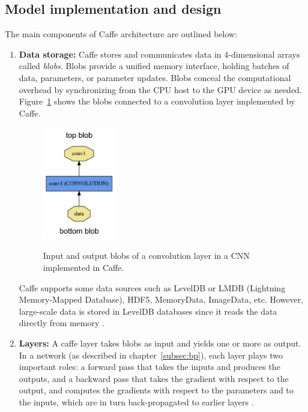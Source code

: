 \subsection{Model implementation and design}
The main components of Caffe architecture are outlined below:
\begin{enumerate}

\item \textbf{Data storage:} Caffe stores and communicates data in 4-dimensional arrays called \textit{blobs}. Blobs provide a unified memory interface, holding batches of data, parameters, or parameter updates. Blobs conceal the computational overhead by synchronizing from the CPU host to the GPU device as needed. Figure~\ref{fig:blob} shows the blobs connected to a convolution layer implemented by Caffe.

\begin{figure}[H]
	\centering
	{\includegraphics[width=0.3\textwidth]{images/blob}}
	\caption{Input and output blobs of a convolution layer in a CNN implemented in Caffe.}
	\label{fig:blob}
\end{figure}


Caffe supports some data sources such as LevelDB or LMDB (Lightning Memory-Mapped Database), HDF5, MemoryData, ImageData, etc. However, large-scale data is stored in LevelDB databases since it reads the data directly from memory \cite{caffe}. 
\item \textbf{Layers:} A caffe layer takes blobs as input and yields one or more as output. In a network (as described in chapter~\ref{subsec:bp}), each layer plays two important roles: a forward pass that takes the inputs and produces the outputs, and a backward pass that takes the gradient with respect to the output, and computes the gradients with respect to the parameters and to the inputs, which are in turn back-propagated to earlier layers \cite{jia2014caffe}.


\end{enumerate}
